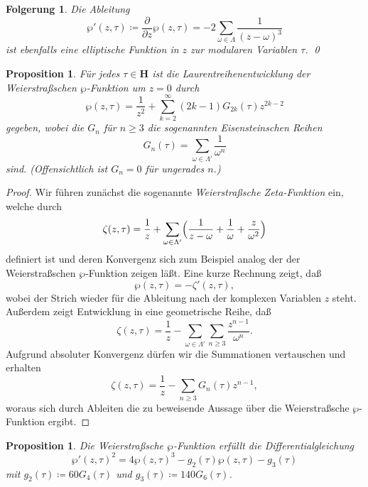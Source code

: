\documentclass[a4paper,twoside,openright]{report}
\newtheorem{prop}[thm]{Proposition}
\newtheorem{cor}[thm]{Folgerung}
\theoremstyle{definition}
\theoremstyle{remark}
\begin{document}
\begin{cor}
  Die Ableitung
  \[
    \wp'(z, \tau) \coloneqq \frac{\partial}{\partial z} \wp(z, \tau)
    = -2 \sum_{\omega \in \Lambda} \frac 1 {(z - \omega)^3}
  \]
  ist ebenfalls eine elliptische Funktion in $z$ zur modularen Variablen $\tau$.
  \qed
\end{cor}

\begin{prop}
  Für jedes $\tau \in \mathbf H$ ist die Laurentreihenentwicklung der Weierstraßschen
  $\wp$-Funktion um $z = 0$ durch
  \[
    \wp(z, \tau) = \frac 1{z^2} + \sum_{k = 2}^\infty (2k - 1) G_{2k}(\tau) z^{2k - 2}
  \] 
  gegeben, wobei die $G_n$ für $n \ge 3$ die sogenannten \emph{Eisensteinschen Reihen}
  \[
    G_n(\tau) = \sum_{\omega \in \Lambda'} \frac{1}{\omega^n}
  \]
  sind. (Offensichtlich ist $G_n = 0$ für ungerades $n$.)
\end{prop}

\begin{proof}
  Wir führen zunächst die sogenannte \emph{Weierstraßsche Zeta-Funktion} ein, welche
  durch
  \[
    \zeta(z, \tau) = \frac 1 z + \sum_{\omega \in \Lambda'} \Bigl(\frac 1{z - \omega} + \frac 1 {\omega} + \frac z {\omega^2}\Bigr)
  \]
  definiert ist und deren Konvergenz sich zum Beispiel analog der der Weierstraßschen
  $\wp$-Funktion zeigen läßt. Eine kurze Rechnung zeigt, daß
  \[
    \wp(z, \tau) = -\zeta'(z, \tau),
  \]
  wobei der Strich wieder für die Ableitung nach der komplexen Variablen $z$ steht.
  Außerdem zeigt Entwicklung in eine geometrische Reihe, daß
  \[
    \zeta(z, \tau) = \frac 1 z - \sum_{\omega \in \Lambda'} \sum_{n \ge 3} \frac {z^{n - 1}}{\omega^n}.
  \]
  Aufgrund absoluter Konvergenz dürfen wir die Summationen vertauschen und erhalten
  \[
    \zeta(z, \tau) = \frac 1 z - \sum_{n \ge 3} G_n(\tau) z^{n - 1},
  \]
  woraus sich durch Ableiten die zu beweisende Aussage über die Weierstraßsche
  $\wp$-Funktion ergibt.  
\end{proof}

\begin{prop}
  Die Weierstraßsche $\wp$-Funktion erfüllt die Differentialgleichung
  \[
    \wp'(z, \tau)^2 = 4 \wp(z, \tau)^3 - g_2(\tau) \wp(z, \tau) - g_3(\tau)
  \]
  mit $g_2(\tau) \coloneqq 60 G_4(\tau)$ und $g_3(\tau) \coloneqq 140 G_6(\tau)$.
\end{prop}
\end{document}
